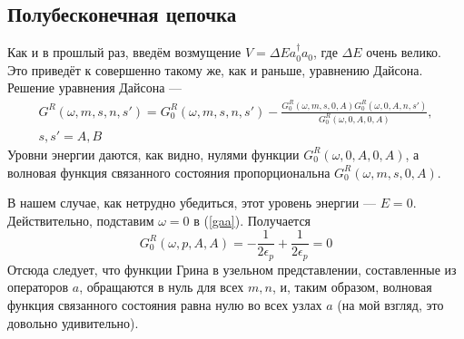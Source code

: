 \subsection{Полубесконечная цепочка}
Как и в прошлый раз, введём возмущение $V = \Delta E a_0^\dagger a_0$, где $\Delta E$ очень велико.
Это приведёт к совершенно такому же, как и раньше, уравнению Дайсона. Решение уравнения Дайсона ---
\begin{multline}
	G^R(\omega, m, s, n, s') = 
		G^R_0(\omega, m,s,n,s') - 
		\frac{G^R_0(\omega, m, s, 0, A)G^R_0(\omega, 0, A, n, s')}{G^R_0(\omega, 0, A, 0, A)},\\
		s,s' = A,B
\end{multline}
Уровни энергии даются, как видно, нулями функции $G^R_0(\omega, 0,A,0,A)$, а волновая функция
связанного состояния пропорциональна $G^R_0(\omega, m,s,0,A)$.

В нашем случае, как нетрудно убедиться, этот уровень энергии --- $E = 0$. Действительно, подставим 
$\omega = 0$ в (\ref{gaa}). Получается
\begin{equation}
	G^R_0 (\omega, p, A, A) = 
		-\frac{1}{2\epsilon_p} + 
					\frac{1}{2\epsilon_p} = 0
\end{equation}
Отсюда следует, что функции Грина в узельном представлении, 
составленные из операторов $a$, обращаются в нуль для всех $m,n$, и, таким образом, волновая 
функция связанного состояния равна нулю во всех узлах $a$ (на мой взгляд, это довольно
удивительно).

